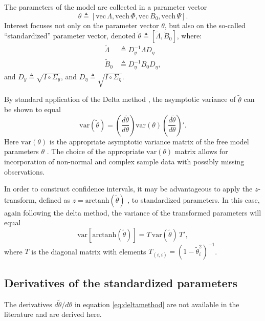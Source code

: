 \documentclass[a4paper, 11pt]{article}
\newcommand{\n}{\eta}
\newcommand{\definedas}{\triangleq}
\newcommand{\hadaprod}{\circ}
\renewcommand{\vec}{\mathrm{vec}\,}
\newcommand{\vech}{\mathrm{vech}\,}
\newcommand{\Lambdastan}{\tilde{\Lambda}}
\newcommand{\Bstan}{\tilde{B}}
\newcommand{\thetastan}{\tilde{\theta}}
\newcommand{\0}{\boldsymbol{0}}
\newcommand{\var}{\mathrm{var}}
\newcommand{\arctanh}{\mathrm{arctanh}}
\begin{document}
The parameters of the model are collected in a parameter
vector $$\theta \definedas [\vec{\Lambda}, \vech{\Phi}, \vec B_0, \vech
\Psi].$$
Interest focuses not only on the parameter vector $\theta$, 
but also on the so-called ``standardized'' parameter vector, denoted
$\thetastan \definedas [\Lambdastan, \Bstan_0]$, where:
\begin{align}\label{eq:lambda_s}
    \Lambdastan &\definedas D^{-1}_y \Lambda D_\n
    \\
    \Bstan_0 &\definedas D^{-1}_\n B_0 D_\n,\label{eq:beta_s}
\end{align}
and $D_y \definedas \sqrt{I \hadaprod \Sigma_y}$, and 
$D_\n \definedas \sqrt{I \hadaprod \Sigma_\n}$. 


By standard application of the Delta method \citep[e.g.][]{oehlert1992note}, the asymptotic variance of $\thetastan$ can be shown to equal
\begin{equation}\label{eq:deltamethod}
\var(\thetastan) = 
	\left(\frac{d \thetastan}{d \theta}\right) 
		\var(\theta) 
	\left(\frac{d \thetastan}{d \theta}\right)'.
\end{equation}
Here $\var(\theta)$ is the appropriate asymptotic variance matrix of the free model parameters $\theta$ \cite[e.g.][143-4]{satorra1989alternative}.
The choice of the appropriate $\var(\theta)$ matrix allows for incorporation of 
non-normal and complex sample data with possibly missing observations.

In order to construct confidence intervals, it may be advantageous to apply the 
$z$-transform, defined as $z = \arctanh(\thetastan)$  \citep[section 35]{fisher1925statistical}, to standardized parameters.
In this case, again following the delta method, the variance of the transformed parameters will equal
\begin{equation}\label{eq:deltamethod-ztransform}
\var[\arctanh(\thetastan)] = 
		T\,
		\var(\thetastan)\,
		T',
\end{equation}
where $T$ is the diagonal matrix with elements $T_{(i,i)} = (1 - \thetastan_i^2)^{-1}$.

\subsection{Derivatives of the standardized parameters}


The derivatives $d \thetastan / d \theta$ in equation \ref{eq:deltamethod} are not available in the literature and are derived here.
\end{document}
